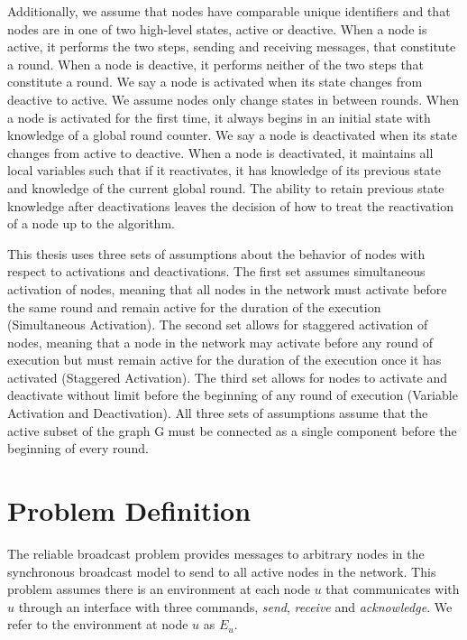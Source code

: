 \documentclass[english]{article}
\begin{document}
Additionally, we assume that nodes have comparable unique identifiers and that nodes are in one of two high-level states, active or deactive. When a node is active, it performs the two steps, sending and receiving messages, that constitute a round. When a node is deactive, it performs neither of the two steps that constitute a round. We say a node is activated when its state changes from deactive to active. We assume nodes only change states in between rounds. When a node is activated for the first time, it always begins in an initial state with knowledge of a global round counter. We say a node is deactivated when its state changes from active to deactive. When a node is deactivated, it maintains all local variables such that if it reactivates, it has knowledge of its previous state and knowledge of the current global round. The ability to retain previous state knowledge after deactivations leaves the decision of how to treat the reactivation of a node up to the algorithm.

This thesis uses three sets of assumptions about the behavior of nodes with respect to activations and deactivations. The first set assumes simultaneous activation of nodes, meaning that all nodes in the network must activate before the same round and remain active for the duration of the execution (Simultaneous Activation). The second set allows for staggered activation of nodes, meaning that a node in the network may activate before any round of execution but must remain active for the duration of the execution once it has activated (Staggered Activation). The third set allows for nodes to activate and deactivate without limit before the beginning of any round of execution (Variable Activation and Deactivation). All three sets of assumptions assume that the active subset of the graph G must be connected as a single component before the beginning of every round.

\section{Problem Definition}

The reliable broadcast problem provides messages to arbitrary nodes in the synchronous broadcast model to send to all active nodes in the network. This problem assumes there is an environment at each node $u$ that communicates with $u$ through an  interface with three commands, \textit{send}, \textit{receive} and \textit{acknowledge}. We refer to the environment at node $u$ as $E_u$.
\end{document}
